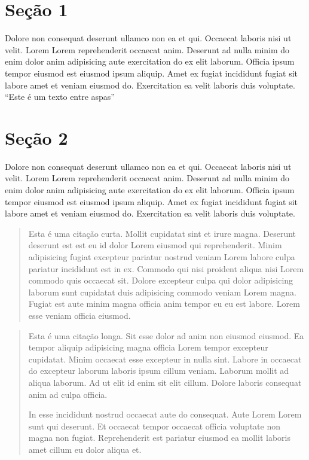 \documentclass[12pt]{report}
\begin{document}
\section{Seção 1}

Dolore non consequat deserunt ullamco non ea et qui. Occaecat laboris nisi ut velit. Lorem Lorem reprehenderit occaecat anim. Deserunt ad nulla minim do enim dolor anim adipisicing aute exercitation do ex elit laborum. Officia ipsum tempor eiusmod est eiusmod ipsum aliquip. Amet ex fugiat incididunt fugiat sit labore amet et veniam eiusmod do. Exercitation ea velit laboris duis voluptate.
\enquote{Este é um texto entre aspas}

\section{Seção 2}

Dolore non consequat deserunt ullamco non ea et qui. Occaecat laboris nisi ut velit. Lorem Lorem reprehenderit occaecat anim. Deserunt ad nulla minim do enim dolor anim adipisicing aute exercitation do ex elit laborum. Officia ipsum tempor eiusmod est eiusmod ipsum aliquip. Amet ex fugiat incididunt fugiat sit labore amet et veniam eiusmod do. Exercitation ea velit laboris duis voluptate.

\begin{quote} %
  Esta é uma citação curta. Mollit cupidatat sint et irure magna. Deserunt deserunt est est eu id dolor Lorem eiusmod qui reprehenderit. Minim adipisicing fugiat excepteur pariatur nostrud veniam Lorem labore culpa pariatur incididunt est in ex. Commodo qui nisi proident aliqua nisi Lorem commodo quis occaecat sit. Dolore excepteur culpa qui dolor adipisicing laborum sunt cupidatat duis adipisicing commodo veniam Lorem magna. Fugiat est aute minim magna officia anim tempor eu eu est labore. Lorem esse veniam officia eiusmod.
\end{quote}

\begin{quotation} %
  Esta é uma citação longa. Sit esse dolor ad anim non eiusmod eiusmod. Ea tempor aliquip adipisicing magna officia Lorem tempor excepteur cupidatat. Minim occaecat esse excepteur in nulla sint. Labore in occaecat do excepteur laborum laboris ipsum cillum veniam. Laborum mollit ad aliqua laborum. Ad ut elit id enim sit elit cillum. Dolore laboris consequat anim ad culpa officia.

  In esse incididunt nostrud occaecat aute do consequat. Aute Lorem Lorem sunt qui deserunt. Et occaecat tempor occaecat officia voluptate non magna non fugiat. Reprehenderit est pariatur eiusmod ea mollit laboris amet cillum eu dolor aliqua et.
\end{quotation}
\end{document}
